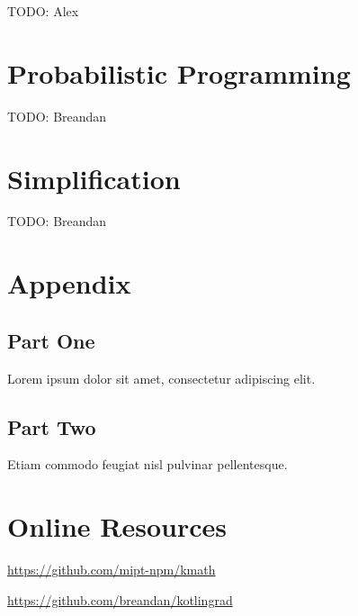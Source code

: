 \documentclass[sigconf]{acmart}
\begin{document}
TODO: Alex

\section{Probabilistic Programming}

TODO: Breandan

\section{Simplification}

TODO: Breandan





\appendix

\section{Appendix}

\subsection{Part One}

Lorem ipsum dolor sit amet, consectetur adipiscing elit.

\subsection{Part Two}

Etiam commodo feugiat nisl pulvinar pellentesque.

\section{Online Resources}

\url{https://github.com/mipt-npm/kmath}

\url{https://github.com/breandan/kotlingrad}
\end{document}
